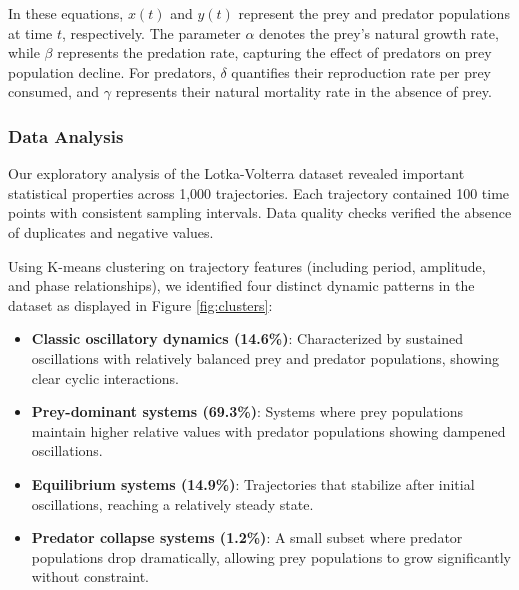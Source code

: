 \documentclass{article}
\begin{document}
In these equations, $x(t)$ and $y(t)$ represent the prey and predator populations at time $t$, respectively. The parameter $\alpha$ denotes the prey's natural growth rate, while $\beta$ represents the predation rate, capturing the effect of predators on prey population decline. For predators, $\delta$ quantifies their reproduction rate per prey consumed, and $\gamma$ represents their natural mortality rate in the absence of prey.

\subsubsection*{Data Analysis}

Our exploratory analysis of the Lotka-Volterra dataset revealed important statistical properties across 1,000 trajectories. Each trajectory contained 100 time points with consistent sampling intervals. Data quality checks verified the absence of duplicates and negative values. 

Using K-means clustering on trajectory features (including period, amplitude, and phase relationships), we identified four distinct dynamic patterns in the dataset as displayed in Figure \ref{fig:clusters}:

\begin{itemize}
\item \textbf{Classic oscillatory dynamics (14.6\%)}: Characterized by sustained oscillations with relatively balanced prey and predator populations, showing clear cyclic interactions.
\item \textbf{Prey-dominant systems (69.3\%)}: Systems where prey populations maintain higher relative values with predator populations showing dampened oscillations.
\item \textbf{Equilibrium systems (14.9\%)}: Trajectories that stabilize after initial oscillations, reaching a relatively steady state.
\item \textbf{Predator collapse systems (1.2\%)}: A small subset where predator populations drop dramatically, allowing prey populations to grow significantly without constraint.
\end{itemize}
\end{document}
